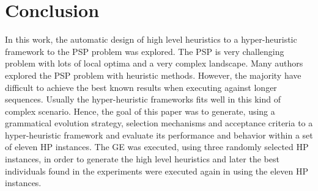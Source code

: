 \documentclass[conference]{IEEEtran}
\begin{document}
%






\section{Conclusion}
In this work, the automatic design of high level heuristics to a hyper-heuristic framework to the PSP problem was explored. The PSP is very challenging problem  with lots of local optima and a very complex landscape. Many authors explored the PSP problem with heuristic methods. However, the majority have difficult to achieve the best known results when executing against longer sequences. Usually the hyper-heuristic frameworks fits well in this kind of complex scenario. Hence, the goal of this paper was to generate, using a grammatical evolution strategy, selection mechanisms and acceptance criteria to a hyper-heuristic framework and evaluate its performance and behavior within a set of eleven HP instances. The GE was executed, using three randomly selected HP instances, in order to generate the high level heuristics and later the best individuals found in the experiments were executed again in using the eleven HP instances. 
\end{document}
